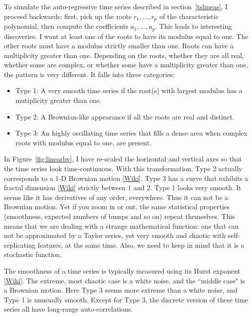 \documentclass[oneside,10pt]{book}
\begin{document}
To simulate the \textcolor{index}{auto-regressive} time series described in section~\ref{tslineas}, I proceed backwards: first, pick up the
roots $r_1,\dots,r_p$ of the \textcolor{index}{characteristic polynomial}, then compute the coefficients $a_1,\dots,a_p$.
This leads to interesting discoveries. I want at least one of the roots to have its modulus equal to one. The other roots must have a modulus strictly smaller than one. Roots can have a multiplicity greater than one. Depending on the roots, whether they are all real, whether some are complex, or whether some have a multiplicity greater than one, the pattern is very different. It falls into three categories:
\begin{itemize}
\item Type 1: A very smooth time series if the root(s) with largest modulus has a mutiplicity greater than one.
\item Type 2: A Brownian-like appearance if all the roots are real and distinct.
\item Type 3: An highly oscillating time series that fills a dense area when complex roots with modulus equal to one, are present.
\end{itemize}
In Figure~\ref{fig:linearbv}, I have re-scaled the horizontal and vertical axes so that the time series look time-continuous. With this transformation, Type 2 actually corresponds to a 1-D \textcolor{index}{Brownian motion} [\href{https://en.wikipedia.org/wiki/Brownian_motion}{Wiki}].
Type 3 has a curve that exhibits a \textcolor{index}{fractal dimension}
[\href{https://en.wikipedia.org/wiki/Fractal_dimension}{Wiki}] strictly between $1$ and $2$. Type 1 looks very smooth. It seems like it has derivatives of any order, everywhere. Thus it can not be a Brownian motion. Yet if you zoom in or out, the same statistical properties (smoothness, expected numbers of bumps and so on) repeat themselves. This means that we are dealing with a strange mathematical function: one that can not be approximated by a Taylor series, yet very smooth and chaotic with self-replicating features, at the same time. Also, we need to keep in mind that it is a \textcolor{index}{stochastic function}.

The smoothness of a time series is typically measured using its \textcolor{index}{Hurst exponent} [\href{https://en.wikipedia.org/wiki/Hurst_exponent}{Wiki}]. The extreme, most chaotic case is a white noise, and the ``middle case" is a Brownian motion. Here Type 3 seems more extreme than a white noise, and Type 1 is unusually smooth. Except for Type 3, the discrete version of these time series all have long-range auto-correlations.
\end{document}
